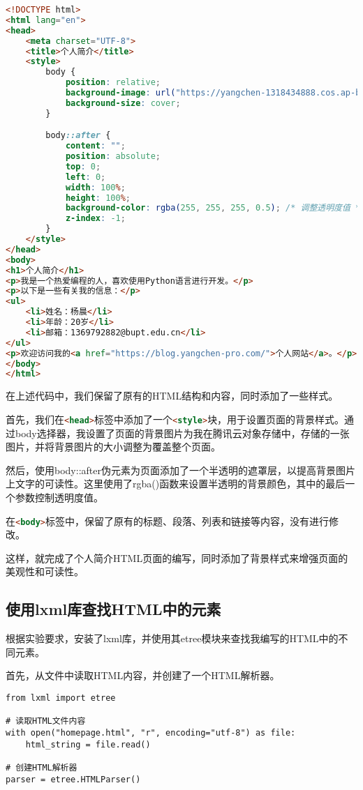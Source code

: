 \documentclass[lang=cn,11pt,a4paper]{elegantpaper}
\begin{document}
\begin{lstlisting}[language=html]
<!DOCTYPE html>
<html lang="en">
<head>
    <meta charset="UTF-8">
    <title>个人简介</title>
    <style>
        body {
            position: relative;
            background-image: url("https://yangchen-1318434888.cos.ap-beijing.myqcloud.com/images%2FOHR.MoonlightRainier_ZH-CN6263832605_UHD.jpg");
            background-size: cover;
        }

        body::after {
            content: "";
            position: absolute;
            top: 0;
            left: 0;
            width: 100%;
            height: 100%;
            background-color: rgba(255, 255, 255, 0.5); /* 调整透明度值 */
            z-index: -1;
        }
    </style>
</head>
<body>
<h1>个人简介</h1>
<p>我是一个热爱编程的人，喜欢使用Python语言进行开发。</p>
<p>以下是一些有关我的信息：</p>
<ul>
    <li>姓名：杨晨</li>
    <li>年龄：20岁</li>
    <li>邮箱：1369792882@bupt.edu.cn</li>
</ul>
<p>欢迎访问我的<a href="https://blog.yangchen-pro.com/">个人网站</a>。</p>
</body>
</html>

\end{lstlisting}

在上述代码中，我们保留了原有的HTML结构和内容，同时添加了一些样式。

首先，我们在\lstinline[language=html]{<head>}标签中添加了一个\lstinline[language=html]{<style>}块，用于设置页面的背景样式。通过body选择器，我设置了页面的背景图片为我在腾讯云对象存储中，存储的一张图片，并将背景图片的大小调整为覆盖整个页面。

然后，使用body::after伪元素为页面添加了一个半透明的遮罩层，以提高背景图片上文字的可读性。这里使用了rgba()函数来设置半透明的背景颜色，其中的最后一个参数控制透明度值。

在\lstinline[language=html]{<body>}标签中，保留了原有的标题、段落、列表和链接等内容，没有进行修改。

这样，就完成了个人简介HTML页面的编写，同时添加了背景样式来增强页面的美观性和可读性。

\subsection{使用lxml库查找HTML中的元素}

根据实验要求，安装了lxml库，并使用其etree模块来查找我编写的HTML中的不同元素。

首先，从文件中读取HTML内容，并创建了一个HTML解析器。

\begin{lstlisting}
from lxml import etree

# 读取HTML文件内容
with open("homepage.html", "r", encoding="utf-8") as file:
    html_string = file.read()

# 创建HTML解析器
parser = etree.HTMLParser()
\end{lstlisting}
\end{document}
